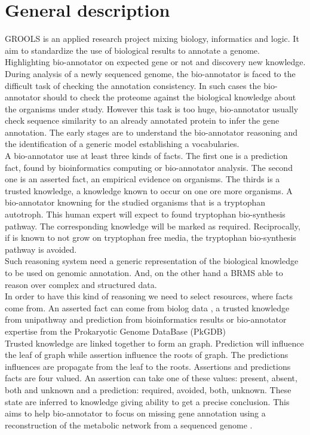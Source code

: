 \documentclass{llncs}
\begin{document}
\section{General description}
GROOLS is an applied research project mixing  biology, informatics and logic. It aim to standardize
the use of biological results to annotate a genome. Highlighting bio-annotator on expected gene or not and discovery new knowledge. During analysis of a newly sequenced genome, the bio-annotator is faced to the difficult task of checking the annotation consistency. In such cases the bio-annotator should to check the proteome against the biological knowledge about the organisms under study. However this task is too huge, bio-annotator usually check sequence similarity to an already annotated protein to infer the gene annotation. The early stages are to understand the bio-annotator reasoning and the identification of a generic model establishing a vocabularies.\\
A bio-annotator use at least three kinds of facts. The first one is a prediction fact, found by bioinformatics computing or bio-annotator analysis. The second one is an asserted fact, an empirical evidence on organisms. The thirds is a trusted knowledge, a knowledge known to occur on one ore more organisms. A bio-annotator knowning for the studied organisms that is a tryptophan autotroph. This human expert will expect to found tryptophan bio-synthesis pathway. The corresponding knowledge will be marked as required. Reciprocally, if is known to not grow on tryptophan free media, the tryptophan bio-synthesis pathway is avoided. \\
Such reasoning system need a generic representation of the biological knowledge to be used on genomic annotation. And, on the other hand a BRMS able to reason over complex and structured data. \\
In order to have this kind of reasoning we need to select resources, where facts come from. An asserted fact can come from biolog data \cite{biolog}, a trusted knowledge from unipathway \cite{morgat2011unipathway} and prediction from bioinformatics results or bio-annotator expertise from the Prokaryotic Genome DataBase (PkGDB) \cite{vallenet2012microscope} \\
Trusted knowledge are linked together to form an graph. Prediction will influence the leaf of graph while assertion influence the roots of graph. The predictions influences are propagate from the leaf to the roots. Assertions and predictions facts are four valued. An assertion can take one of these values:  present, absent, both and unknown and a prediction: required, avoided, both, unknown. These state are inferred to knowledge giving ability to get a precise conclusion. This aims to help bio-annotator to focus on missing gene annotation using a reconstruction of the metabolic network from a sequenced genome \cite{francke2005reconstructing}.\\
\end{document}
